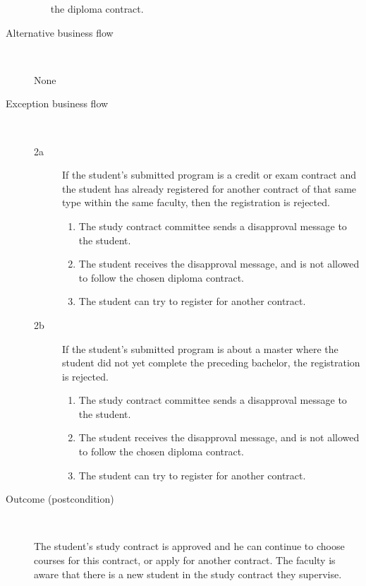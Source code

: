 \begin{description}
\begin{enumerate}
	  	the diploma contract.
	\end{enumerate}
	\item[Alternative business flow] \
		\par None
	\item[Exception business flow] \ 
	\begin{description}
		\item[2a] If the student's submitted program is a credit or exam contract and
		the student has already registered for another contract of that same type
		within the same faculty, then the registration is rejected.
		\begin{enumerate}
		  	\item The study contract committee sends a disapproval message to the
		  	student.
		  	\item The student receives the disapproval message, and is not allowed to
		  	follow the chosen diploma contract.
		  	\item The student can try to register for another contract.
		\end{enumerate}
		\item[2b] If the student's submitted program is about a master where the
		student did not yet complete the preceding bachelor, the registration is
		rejected.
		\begin{enumerate}
		  	\item The study contract committee sends a disapproval message to the
		  	student.
		  	\item The student receives the disapproval message, and is not allowed to
		  	follow the chosen diploma contract.
		  	\item The student can try to register for another contract.
		\end{enumerate}
	\end{description}
	\item[Outcome (postcondition)] \ 
		\par The student's study contract is approved and he can continue to choose
		courses for this contract, or apply for another contract. The faculty is aware
		that there is a new student in the study contract they supervise.
\end{description}

